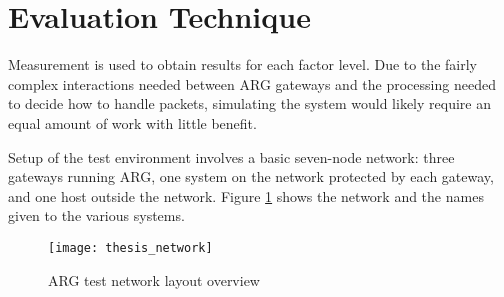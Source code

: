 \begin{comment}
\item Latency between \ac{ARG} gateways
	\par The test network runs through a single switch running four \acp{VLAN}, with an average latency under 1 millisecond. Introducing artificial latency simulates a more realistic range of environments.

\item Packet Delay
	\par Each test spawns a number of traffic generators at different points in the test network. The packet delay shown here is used as a wait between each packet sent. Lower delays result in more frequent sends and force the gateways to deal with more packets per second.

\item Traffic direction and type
	\par \ac{ARG} is capable of handling \ac{TCP}, \ac{UDP}, and \ac{ICMP} traffic. All tests use equal amounts of \ac{TCP} and \ac{UDP} traffic, but some vary the direction. Section \ref{sec:exp_design} gives a full description of the various tests and Figure \ref{fig:testnum_flows} illustrates the direction of all traffic on the network.
\end{itemize}
\end{comment}

\section{Evaluation Technique}
\label{sec:eval_technique}
\par Measurement is used to obtain results for each factor level. Due to the fairly complex interactions needed between \ac{ARG} gateways and the processing needed to decide how to handle packets, simulating the system would likely require an equal amount of work with little benefit.

\par Setup of the test environment involves a basic seven-node network: three gateways running \ac{ARG}, one system on the network protected by each gateway, and one host outside the network. Figure \ref{fig:argnetwork} shows the network and the names given to the various systems.

\begin{figure}
	\centering
	\caption{\ac{ARG} test network layout overview}
	\label{fig:argnetwork}
	\texttt{[image: thesis\_network]}
\end{figure}

